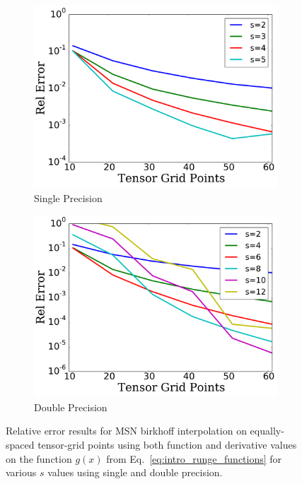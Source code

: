 \begin{figure}
\centering
    \begin{subfigure}{0.45\textwidth}
    \includegraphics[width=\textwidth]{plots/msn_birkhoff_2d_single.pdf}
    \caption{Single Precision}
    \end{subfigure}
    \begin{subfigure}{0.45\textwidth}
    \includegraphics[width=\textwidth]{plots/msn_birkhoff_2d_double.pdf}
    \caption{Double Precision}
    \end{subfigure}
\caption[MSN 2D Birkhoff Interpolation Relative Error]{
Relative error results for MSN birkhoff interpolation on equally-spaced
tensor-grid points using both function and derivative values
on the function $g(x)$ from Eq.~\eqref{eq:intro_runge_functions}
for various $s$ values using single and double precision.}
\label{fig:intro_msn_birkhoff_2d}
\end{figure}



